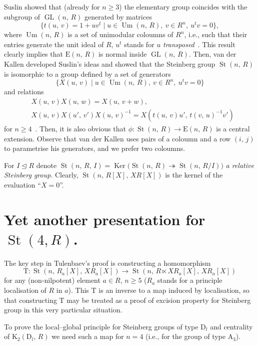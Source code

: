 \documentclass[11pt]{amsart}
\theoremstyle{plain} \declaretheorem[name=Theorem, Refname={Theorem,Theorems}]{tm} \Crefname{tm}{Theorem}{Theorems}
\numberwithin{equation}{section}
\theoremstyle{definition} \newtheorem{df}[lm]{Definition} \Crefname{df}{Definition}{Definitions}
\theoremstyle{remark} \newtheorem{rk}[lm]{Remark} \Crefname{rk}{Remark}{Remarks}
\newcommand{\Ker}{\mathop{\mathrm{Ker}}\nolimits}
\newcommand{\E}{{\mathrm{E}}}
\newcommand{\Um}{\mathop{\mathrm{Um}}\nolimits}
\newcommand{\St}{\mathop{\mathrm{St}}\nolimits}
\newcommand{\GL}{\mathop{\mathrm{GL}}\nolimits}
\newcommand{\epi}{\twoheadrightarrow}
\newcommand{\inv}{^{-1}}
\begin{document}
Suslin showed that (already for $n\geq3$) the elementary group coincides with the subgroup of $\GL(n,\,R)$ generated by matrices
$$\{t(u,\,v)=1+uv^t\mid u\in\Um(n,\,R),\ v\in R^n,\ u^tv=0\},$$
where $\Um(n,\,R)$ is a set of unimodular coloumns of $R^n$, i.e., such that their entries generate the unit ideal of $R$, $u^t$ stands for $u$ {\it transposed}~\cite{Sus}.
This result clearly implies that $\E(n,\,R)$ is normal inside $\GL(n,\,R)$.
Then, van der Kallen developed Suslin's ideas and showed that the Steinberg group $\St(n,\,R)$ is isomorphic to a group defined by a set of generators
$$\{X(u,\,v)\mid u\in\Um(n,\,R),\ v\in R^n,\ u^tv=0\}$$ and relations
\setcounter{equation}{0} \renewcommand{\theequation}{K\arabic{equation}}
\begin{align}
&X(u,\,v)X(u,\,w)=X(u,\,v+w),\\
&X(u,\,v)X(u',\,v')X(u,\,v)\inv=X(t(u,\,v)u',\,t(v,\,u)\inv v')
\end{align}
for $n\geq4$~\cite{vdK}.
Then, it is also obvious that $\phi\colon\St(n,\,R)\rightarrow\E(n,\,R)$ is a central extension.
Observe that van der Kallen uses pairs of a coloumn and a row $(i,\,j)$ to parametrise his generators, and we prefer two coloumns.


For $I\trianglelefteq R$ denote $\St(n,\,R,\,I)=\Ker\big(\St(n,\,R)\epi\St(n,\,R/I)\big)$ {\it a relative Steinberg group}. Clearly, $\St(n,\,R[X],\,XR[X])$ is the kernel of the evaluation ``$X=0$''.

\section{Yet another presentation for $\St(4, R)$.} \label{sec:yap}

The key step in Tulenbaev's proof is constructing a homomorphism
$$
\mathrm T\colon\St(n,\,R_a[X],\,XR_a[X])\rightarrow\St(n,\,R\ltimes XR_a[X],\,XR_a[X])
$$
for any (non-nilpotent) element $a\in R$, $n\geq5$ ($R_a$ stands for a principle localisation of $R$ in $a$). This $\mathrm T$ is an inverse to a map induced by localisation, so that constructing $\mathrm T$ may be treated as a proof of excision property for Steinberg group in this very particular situation.

To prove the local--global principle for Steinberg groups of type $\mathrm D_l$ and centrality of $\mathrm K_2(\mathrm D_l,\,R)$ we need such a map for $n=4$ (i.e., for the group of type $\mathrm A_3$).
\end{document}
